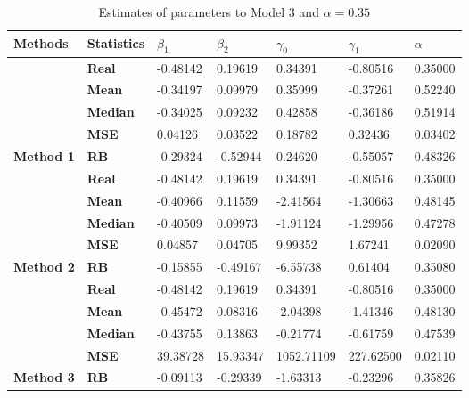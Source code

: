 \begin{table}

\caption{\label{tab:Est_model_3_Alpha0.35}Estimates of parameters to Model 3 and $\alpha=0.35$}
\centering
\begin{tabular}[t]{>{}l>{}llllll}
\toprule
Methods & Statistics & $\beta_1$ & $\beta_2$ & $\gamma_0$ & $\gamma_1$ & $\alpha$\\
\midrule
 & \textbf{Real} & -0.48142 & 0.19619 & 0.34391 & -0.80516 & 0.35000\\
\cmidrule{2-7}
 & \textbf{Mean} & -0.34197 & 0.09979 & 0.35999 & -0.37261 & 0.52240\\
\cmidrule{2-7}
 & \textbf{Median} & -0.34025 & 0.09232 & 0.42858 & -0.36186 & 0.51914\\
\cmidrule{2-7}
 & \textbf{MSE} & 0.04126 & 0.03522 & 0.18782 & 0.32436 & 0.03402\\
\cmidrule{2-7}
\multirow{-5}{*}{\raggedright\arraybackslash \textbf{Method 1}} & \textbf{RB} & -0.29324 & -0.52944 & 0.24620 & -0.55057 & 0.48326\\
\cmidrule{1-7}
 & \textbf{Real} & -0.48142 & 0.19619 & 0.34391 & -0.80516 & 0.35000\\
\cmidrule{2-7}
 & \textbf{Mean} & -0.40966 & 0.11559 & -2.41564 & -1.30663 & 0.48145\\
\cmidrule{2-7}
 & \textbf{Median} & -0.40509 & 0.09973 & -1.91124 & -1.29956 & 0.47278\\
\cmidrule{2-7}
 & \textbf{MSE} & 0.04857 & 0.04705 & 9.99352 & 1.67241 & 0.02090\\
\cmidrule{2-7}
\multirow{-5}{*}{\raggedright\arraybackslash \textbf{Method 2}} & \textbf{RB} & -0.15855 & -0.49167 & -6.55738 & 0.61404 & 0.35080\\
\cmidrule{1-7}
 & \textbf{Real} & -0.48142 & 0.19619 & 0.34391 & -0.80516 & 0.35000\\
\cmidrule{2-7}
 & \textbf{Mean} & -0.45472 & 0.08316 & -2.04398 & -1.41346 & 0.48130\\
\cmidrule{2-7}
 & \textbf{Median} & -0.43755 & 0.13863 & -0.21774 & -0.61759 & 0.47539\\
\cmidrule{2-7}
 & \textbf{MSE} & 39.38728 & 15.93347 & 1052.71109 & 227.62500 & 0.02110\\
\cmidrule{2-7}
\multirow{-5}{*}{\raggedright\arraybackslash \textbf{Method 3}} & \textbf{RB} & -0.09113 & -0.29339 & -1.63313 & -0.23296 & 0.35826\\
\bottomrule
\end{tabular}
\end{table}
